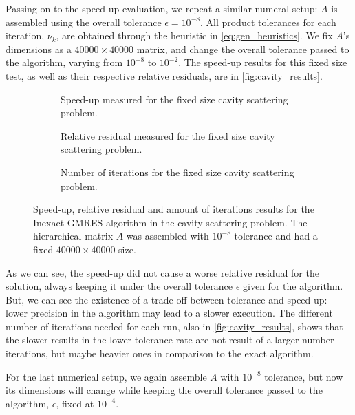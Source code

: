 Passing on to the speed-up evaluation, we repeat a similar numeral setup: $A$ is assembled using the overall tolerance $\epsilon = 10^{-8}$. All product tolerances for each iteration, $\nu_{k}$, are obtained through the heuristic in \ref{eq:gen_heuristics}. We fix $A$'s dimensions as a $40000\times 40000$ matrix, and change the overall tolerance passed to the algorithm, varying from $10^{-8}$ to $10^{-2}$. The speed-up results for this fixed size test, as well as their respective relative residuals, are in \autoref{fig:cavity_results}.

\begin{figure}[h!]
    \centering
    \begin{subfigure}[b]{0.6\linewidth}
        
        \caption{Speed-up measured for the fixed size cavity scattering problem.}
    \end{subfigure}
    \begin{subfigure}[b]{0.4\linewidth}
        
        \caption{Relative residual measured for the fixed size cavity scattering problem.}
    \end{subfigure}
    \begin{subfigure}[b]{0.4\linewidth}
        
        \caption{Number of iterations for the fixed size cavity scattering problem.}
    \end{subfigure}
    \caption{Speed-up, relative residual and amount of iterations results for the Inexact GMRES algorithm in the cavity scattering problem. The hierarchical matrix $A$ was assembled with $10^{-8}$ tolerance and had a fixed $40000 \times 40000$ size.}
    \label{fig:cavity_results}
\end{figure}

As we can see, the speed-up did not cause a worse relative residual for the solution, always keeping it under the overall tolerance $\epsilon$ given for the algorithm. But, we can see the existence of a trade-off between tolerance and speed-up: lower precision in the algorithm may lead to a slower execution. The different number of iterations needed for each run, also in \autoref{fig:cavity_results}, shows that the slower results in the lower tolerance rate are not result of a larger number iterations, but maybe heavier ones in comparison to the exact algorithm.

For the last numerical setup, we again assemble $A$ with $10^{-8}$ tolerance, but now its dimensions will change while keeping the overall tolerance passed to the algorithm, $\epsilon$, fixed at $10^{-4}$.

